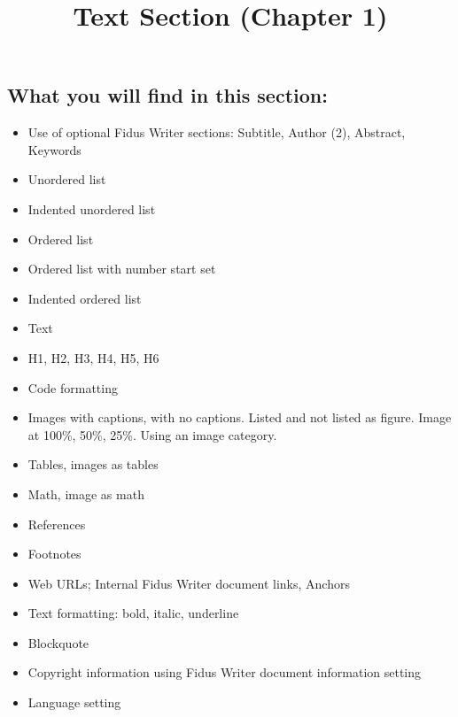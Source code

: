 \documentclass{article}
\begin{document}
\title{Text Section (Chapter 1)}

\maketitle


\subsection{What you will find in this section:}\label{H1003956}


\begin{itemize}
\item Use of optional Fidus Writer sections: Subtitle, Author (2), Abstract, Keywords


\item Unordered list


\item Indented unordered list


\item Ordered list


\item Ordered list with number start set


\item Indented ordered list


\item Text


\item H1, H2, H3, H4, H5, H6


\item Code formatting


\item Images with captions, with no captions. Listed and not listed as figure. Image at 100\%, 50\%, 25\%. Using an image category.


\item Tables, images as tables


\item Math, image as math


\item References


\item Footnotes


\item Web URLs; Internal Fidus Writer document links, Anchors


\item Text formatting: bold, italic, underline


\item Blockquote


\item Copyright information using Fidus Writer document information setting


\item Language setting


\end{itemize}
\end{document}
